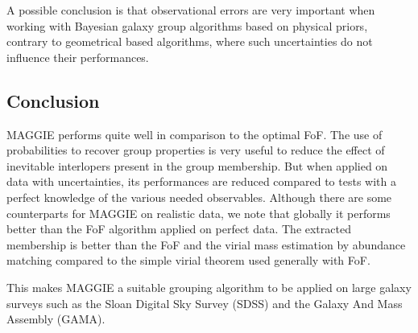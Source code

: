 A possible conclusion is that observational errors are very important when
working with Bayesian galaxy group algorithms based on physical priors,
contrary to geometrical based algorithms, where such uncertainties do not
influence their performances.

\subsection{Conclusion}
\label{sub:maggie_discussion_conclusion}

MAGGIE performs quite well in comparison to the optimal FoF. The use of
probabilities to recover group properties is very useful to reduce the effect
of inevitable interlopers present in the group membership. But when applied on
data with uncertainties, its performances are reduced compared to tests with a
perfect knowledge of the various needed observables. Although there are some
counterparts for MAGGIE on realistic data, we note that globally it performs
better than the FoF algorithm applied on perfect data. The extracted membership
is better than the FoF and the virial mass estimation by abundance matching
compared to the simple virial theorem used generally with FoF.

This makes MAGGIE a suitable grouping algorithm to be applied on large
galaxy surveys such as the Sloan Digital Sky Survey (SDSS) and the Galaxy And
Mass Assembly (GAMA).

